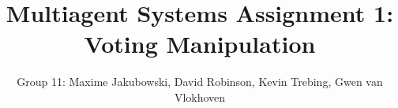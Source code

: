 \documentclass[sigconf]{aamas}
\begin{document}
\title{Multiagent Systems Assignment 1: Voting Manipulation}  

\author{Group 11: Maxime Jakubowski, David Robinson, Kevin Trebing, Gwen van Vlokhoven}  

\maketitle




\end{document}
